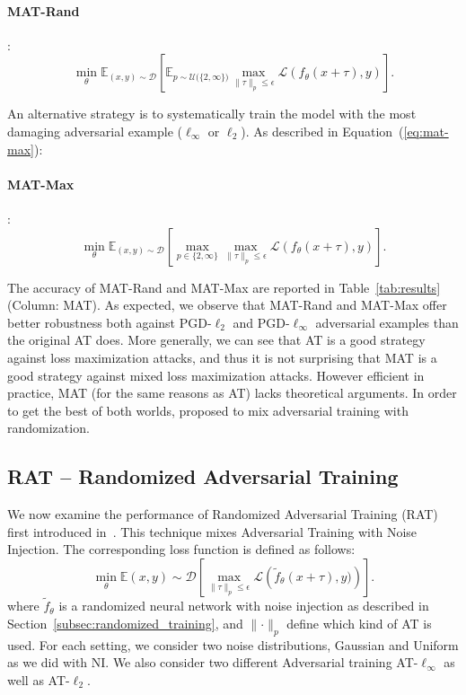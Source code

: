 \paragraph{MAT-Rand}:
\begin{equation}
    \min_{\theta}\mathbb{E}_{(x, y) \sim \mathcal{D}} \left[\mathbb{E}_{p\sim\mathcal{U}({\{2, \infty\})}} \max_{\lVert\tau\rVert_p \leq \epsilon} \mathcal{L} \left( f_{\theta}(x+\tau), y \right) \right].
    \label{eq:mat-rand}
\end{equation}

\noindent
An alternative strategy is to systematically train the model with the most damaging adversarial example ($\ell_\infty$ or $\ell_2$). As described in Equation~(\ref{eq:mat-max}): 

\paragraph{MAT-Max}:
\begin{equation}
    \min_{\theta}\mathbb{E}_{(x, y) \sim \mathcal{D}} \left[ \max_{p \in \{2, \infty\}} \max_{\lVert\tau\rVert_p \leq \epsilon} \mathcal{L} \left( f_{\theta}(x+\tau), y \right) \right].
    \label{eq:mat-max}
\end{equation}

\noindent
The accuracy of MAT-Rand and MAT-Max are reported in Table~\ref{tab:results} (Column: MAT). As expected, we observe that MAT-Rand and MAT-Max offer better robustness both against PGD-$\ell_2$ and PGD-$\ell_\infty$ adversarial examples than the original AT does. More  generally, we can see that AT is a good strategy against loss maximization attacks, and thus it is not surprising that MAT is a good strategy against mixed loss maximization attacks. However efficient in practice, MAT (for the same reasons as AT) lacks theoretical arguments. In order to get the best of both worlds, \cite{salman2019provably} proposed to mix adversarial training with randomization.  


\subsection{RAT -- Randomized Adversarial Training}\label{subsec:randomized_adversarial_training}

We now examine the performance of Randomized Adversarial Training (RAT) first introduced in~\cite{salman2019provably}. This technique mixes Adversarial Training with Noise Injection. The corresponding loss function is defined as follows: \begin{equation}
    \min_{\theta}\mathbb{E}{(x, y) \sim \mathcal{D}} \left[ \max_{\lVert\tau\rVert_p \leq \epsilon} \mathcal{L} \left( \tilde{f}_{\theta}(x+\tau), y)  \right) \right].
\end{equation}
\noindent where $\tilde{f}_\theta$ is a randomized neural network with noise injection as described in Section~\ref{subsec:randomized_training}, and $\lVert\cdot\rVert_p$ define which kind of AT is used. For each setting, we consider two noise distributions, Gaussian and Uniform as we did with NI. We also consider two different Adversarial training AT-$\ell_\infty$ as well as AT-$\ell_2$. 

